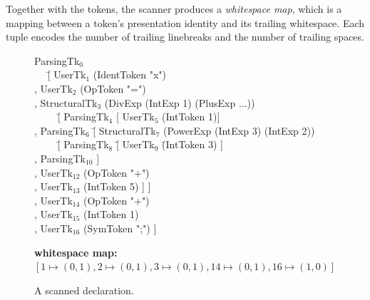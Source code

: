 \documentclass[12pt]{article}
\begin{document}
Together with the tokens, the scanner produces a {\em whitespace map}, which is a mapping between a token's presentation identity and its trailing whitespace. Each tuple encodes the number of trailing linebreaks and the number of trailing spaces.


\begin{figure}
\begin{footnotesize}
\begin{tabbedCode}
ParsingTk$_0$ \= \\
~~ \= [ UserTk$_1$ (IdentToken "x") \\
   \> , UserTk$_2$ (OpToken "=") \\
   \> , StructuralTk$_3$ (DivExp (IntExp 1) (PlusExp ...))\\
   \> ~~~~ \= [ ParsingTk$_4$ [ UserTk$_5$ (IntToken 1)] \\
   \>      \> , ParsingTk$_6$ \= [ StructuralTk$_7$ (PowerExp (IntExp 3) (IntExp 2))\\
   \>      \>              \> ~~~~ \= [ ParsingTk$_8$    \= [ UserTk$_9$ \= (IntToken 3) ] \\
   \>      \>              \>      \> , ParsingTk$_{10}$  ]\\
   \>      \>              \> , UserTk$_{12}$ (OpToken "+") \\
   \>      \>              \> , UserTk$_{13}$ (IntToken 5) ] ] \\
   \> , UserTk$_{14}$ (OpToken "+") \\
   \> , UserTk$_{15}$ (IntToken 1) \\
   \> , UserTk$_{16}$ (SymToken ";") ]
\end{tabbedCode}
{\bf whitespace map:} $[ 1 \mapsto (0,1), 2 \mapsto (0,1), 3 \mapsto (0,1), 14 \mapsto (0,1), 16 \mapsto (1,0) ]$
\end{footnotesize}
\caption{A scanned declaration.} \label{fig:scanResult} 
\end{figure}

\end{document}
